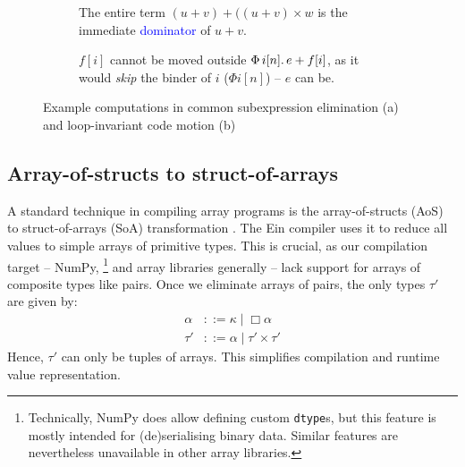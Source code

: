 \begin{figure}
\centering
\begin{subfigure}{.45\textwidth}
  \centering
{}
  \caption{The entire term $(u + v) + ((u + v) \times w$ is the immediate \textcolor{blue}{dominator} of $u + v$.}
\end{subfigure}%
\quad
\begin{subfigure}{.45\textwidth}
  \centering
{}
  \caption{$f[i]$ cannot be moved outside $\Phi\, {i}[{n}] \ldotp {e + f[i]}$, as it would \textit{skip} the binder of $i$ ($\Phi i[n]$) -- $e$ can be.}
\end{subfigure}
\caption{Example computations in common subexpression elimination (a) and loop-invariant code motion (b)}
\label{fig:transform-examples}
\end{figure}

\subsection{Array-of-structs to struct-of-arrays}
\label{aos-to-soa}

A standard technique in compiling array programs is the array-of-structs (AoS) to struct-of-arrays (SoA) transformation \cite{shaikhha2019efficient}. The Ein compiler uses it to reduce all values to simple arrays of primitive types. This is crucial, as our compilation target -- NumPy,%
\footnote{Technically, NumPy does allow defining custom \texttt{dtype}s, but this feature is mostly intended for (de)serialising binary data. Similar features are nevertheless unavailable in other array libraries.} 
and array libraries generally -- lack support for arrays of composite types like pairs. Once we eliminate arrays of pairs, the only types $\tau'$ are given by:
\begin{align*}
\alpha &::= \kappa \mid \Box \alpha \\
\tau' &::= \alpha \mid \tau' \times \tau'
\end{align*}
Hence, $\tau'$ can only be tuples of arrays. This simplifies compilation and runtime value representation. 


